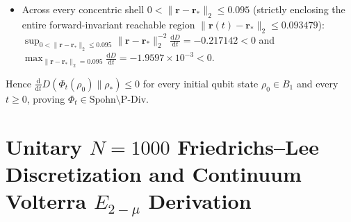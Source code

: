 \documentclass[onecolumn,10pt,notitlepage,amsmath,amssymb,floatfix]{revtex4-2}
\theoremstyle{plain}
\theoremstyle{definition}
\newcommand{\dd}{\mathrm{d}}
\begin{document}
\begin{enumerate}[label=(\roman*),leftmargin=1.8em,itemsep=2pt]
\begin{itemize}[leftmargin=1.4em,itemsep=1pt]
\item Across every concentric shell $0 < \|\mathbf{r}-\mathbf{r}_*\|_2 \le 0.095$ (strictly enclosing the entire forward-invariant reachable region $\|\mathbf{r}(t)-\mathbf{r}_*\|_2 \le 0.093479$): $\sup_{0 < \|\mathbf{r}-\mathbf{r}_*\|_2 \le 0.095} \|\mathbf{r}-\mathbf{r}_*\|_2^{-2}\frac{\dd D}{\dd t} = -0.217142 < 0$ and $\max_{\|\mathbf{r}-\mathbf{r}_*\|_2 = 0.095}\frac{\dd D}{\dd t} = -1.9597\times 10^{-3} < 0$.
\end{itemize}
Hence $\frac{\dd}{\dd t} D(\Phi_t(\rho_0)\parallel\rho_*) \le 0$ for every initial qubit state $\rho_0 \in B_1$ and every $t \ge 0$, proving $\Phi_t \in \mathrm{Spohn} \setminus \mathrm{P\text{-}Div}$.
\end{enumerate}

\section{Unitary \texorpdfstring{$N = 1000$}{N = 1000} Friedrichs--Lee Discretization and Continuum Volterra \texorpdfstring{$E_{2-\mu}$}{E\_\{2-mu\}} Derivation}
\label{sec:S6}
\end{document}
